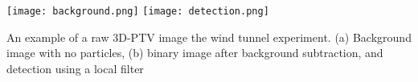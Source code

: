 \begin{frame}
\begin{card}
\centering\texttt{[image: background.png]} \hspace{.5cm}\texttt{[image: detection.png]} \hspace{.5cm} 
\end{card}
\begin{card}
An example of a raw 3D-PTV image the wind tunnel experiment. (a) Background image with no particles, (b) binary image after background subtraction, and detection using a local filter 
\end{card}
\end{frame}













